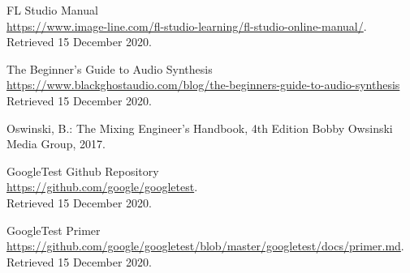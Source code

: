 \documentclass[a4paper,12pt]{report}
\begin{document}
\begin{thebibliography}{9}
FL Studio Manual\\
\url{https://www.image-line.com/fl-studio-learning/fl-studio-online-manual/}.\\
Retrieved 15 December 2020.

The Beginner's Guide to Audio Synthesis\\
\url{https://www.blackghostaudio.com/blog/the-beginners-guide-to-audio-synthesis}\\
Retrieved 15 December 2020.

Oswinski, B.: The Mixing Engineer's Handbook, 4th Edition
Bobby Owsinski Media Group, 2017.

GoogleTest Github Repository\\
\url{https://github.com/google/googletest}.\\
Retrieved 15 December 2020.

GoogleTest Primer\\
\url{https://github.com/google/googletest/blob/master/googletest/docs/primer.md}.\\
Retrieved 15 December 2020.

\end{thebibliography}
\cleardoublepage
{}
\listoffigures
\cleardoublepage
{}
\lstlistoflistings
\end{document}
